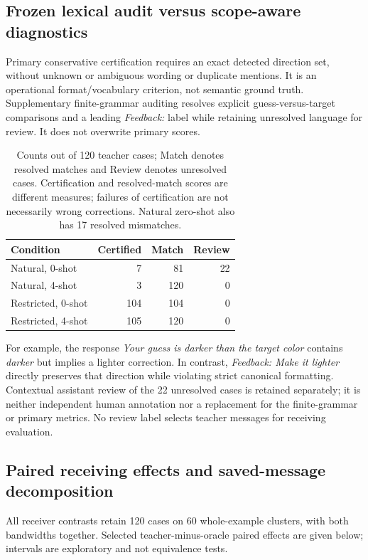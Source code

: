 \subsection{Frozen lexical audit versus scope-aware diagnostics}
Primary conservative certification requires an exact detected direction set,
without unknown or ambiguous wording or duplicate mentions. It is an
operational format/vocabulary criterion, not semantic ground truth.
Supplementary finite-grammar auditing resolves explicit guess-versus-target
comparisons and a leading \emph{Feedback:} label while retaining unresolved
language for review. It does not overwrite primary scores.

\begin{table}[H]
\centering\small
\begin{tabular}{@{}lrrr@{}}
\toprule
Condition & Certified & Match & Review \\
\midrule
Natural, 0-shot & 7 & 81 & 22 \\
Natural, 4-shot & 3 & 120 & 0 \\
Restricted, 0-shot & 104 & 104 & 0 \\
Restricted, 4-shot & 105 & 120 & 0 \\
\bottomrule
\end{tabular}
\caption{Counts out of 120 teacher cases; Match denotes resolved matches
and Review denotes unresolved cases. Certification and resolved-match
scores are different measures; failures of certification are not necessarily
wrong corrections. Natural zero-shot also has 17 resolved mismatches.}
\end{table}

For example, the response \emph{Your guess is darker than the target color}
contains \emph{darker} but implies a lighter correction. In contrast,
\emph{Feedback: Make it lighter} directly preserves that direction while
violating strict canonical formatting. Contextual assistant review of the
22 unresolved cases is retained separately; it is neither independent human
annotation nor a replacement for the finite-grammar or primary metrics.
No review label selects teacher messages for receiving evaluation.

\subsection{Paired receiving effects and saved-message decomposition}
All receiver contrasts retain 120 cases on 60 whole-example clusters,
with both bandwidths together. Selected teacher-minus-oracle paired effects
are given below; intervals are exploratory and not equivalence tests.

